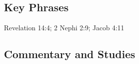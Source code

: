 \subsection{Key Phrases} %
	\label{FIRSTFRUITS-PHRASES}

	\begin{compactdesc}
		\item[firstfruits unto God] Revelation 14:4; 2 Nephi 2:9; Jacob 4:11
	\end{compactdesc}
	


	
	
	
	
\subsection{Commentary and Studies} %
	\label{FIRSTFRUITS-COMMENTARY}
	
